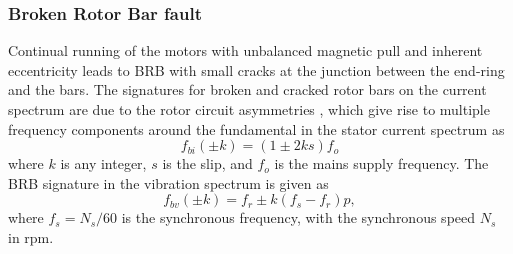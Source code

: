 \subsubsection{Broken Rotor Bar fault}
Continual running of the motors with unbalanced magnetic pull and inherent eccentricity leads to BRB with small cracks at the junction between the end-ring and the bars. The signatures for broken and cracked rotor bars on the current spectrum are due to the rotor circuit asymmetries \cite{Henao2014, kia2005, didier2006}, which give rise to multiple frequency components around the fundamental in the stator current spectrum as
\begin{equation}
	\label{fBRB}
	{f_{bi}(\pm k)} = (1 \pm 2ks)f_o
\end{equation}
where $k$ is any integer, $s$ is the slip, and $f_o$ is the mains supply frequency. The BRB signature in the vibration spectrum is given as
\begin{equation}
	{f_{bv}(\pm k)} = {f_r} \pm k({f_s} - {f_r})p,
	\label{brbSig}
\end{equation}
where $f_s=N_s/60$ is the synchronous frequency, with the synchronous speed $N_s$ in rpm.
